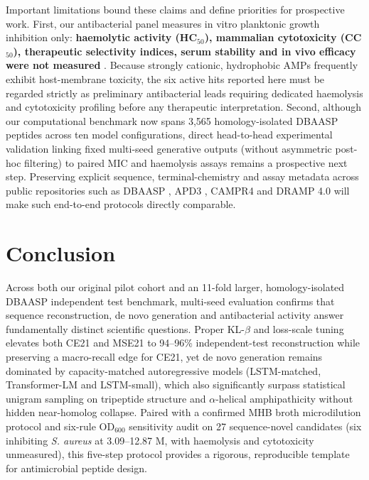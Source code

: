 \documentclass[unnumsec,webpdf,contemporary,large]{oup-authoring-template}
\newcommand{\rev}[1]{#1}
\begin{document}
\rev{Important limitations bound these claims and define priorities for prospective work. First, our antibacterial panel measures in vitro planktonic growth inhibition only: \textbf{haemolytic activity (HC$_{50}$), mammalian cytotoxicity (CC$_{50}$), therapeutic selectivity indices, serum stability and in vivo efficacy were not measured} \cite{ref24,ref67,ref70}. Because strongly cationic, hydrophobic AMPs frequently exhibit host-membrane toxicity, the six active hits reported here must be regarded strictly as preliminary antibacterial leads requiring dedicated haemolysis and cytotoxicity profiling before any therapeutic interpretation. Second, although our computational benchmark now spans 3,565 homology-isolated DBAASP peptides across ten model configurations, direct head-to-head experimental validation linking fixed multi-seed generative outputs (without asymmetric post-hoc filtering) to paired MIC and haemolysis assays remains a prospective next step. Preserving explicit sequence, terminal-chemistry and assay metadata across public repositories such as DBAASP \cite{ref10}, APD3 \cite{ref60}, CAMPR4 \cite{ref63} and DRAMP 4.0 \cite{ref61} will make such end-to-end protocols directly comparable.}

\section{Conclusion}

\rev{Across both our original pilot cohort and an 11-fold larger, homology-isolated DBAASP independent test benchmark, multi-seed evaluation confirms that sequence reconstruction, de novo generation and antibacterial activity answer fundamentally distinct scientific questions. Proper KL-$\beta$ and loss-scale tuning elevates both CE21 and MSE21 to 94--96\% independent-test reconstruction while preserving a macro-recall edge for CE21, yet de novo generation remains dominated by capacity-matched autoregressive models (LSTM-matched, Transformer-LM and LSTM-small), which also significantly surpass statistical unigram sampling on tripeptide structure and $\alpha$-helical amphipathicity without hidden near-homolog collapse. Paired with a confirmed MHB broth microdilution protocol and six-rule OD$_{600}$ sensitivity audit on 27 sequence-novel candidates (six inhibiting \textit{S. aureus} at 3.09--12.87 \textmu{}M, with haemolysis and cytotoxicity unmeasured), this five-step protocol provides a rigorous, reproducible template for antimicrobial peptide design.}

\FloatBarrier
\end{document}

